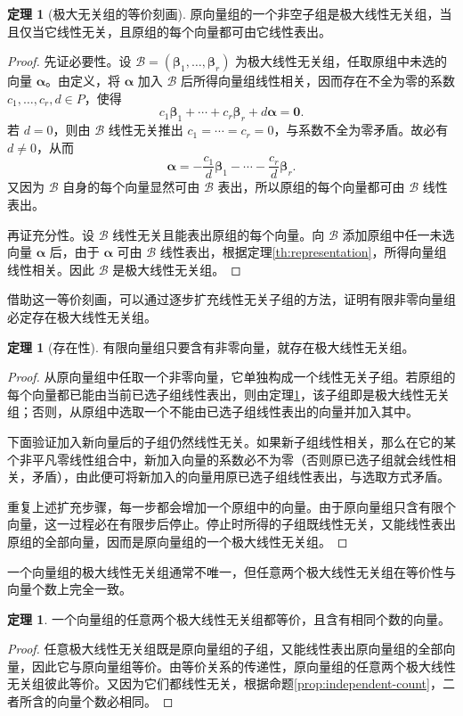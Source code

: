 \documentclass[UTF8, fontset=fandol, a4paper, 12pt]{ctexart}
\newcommand{\va}{\boldsymbol\alpha}
\newcommand{\vb}{\boldsymbol\beta}
\newcommand{\vo}{\boldsymbol0}
\theoremstyle{definition}
\newtheorem{theorem}[definition]{定理}
\begin{document}
\begin{theorem}[极大无关组的等价刻画]\label{th:maximal}
原向量组的一个非空子组是极大线性无关组，当且仅当它线性无关，且原组的每个向量都可由它线性表出。
\end{theorem}
\begin{proof}
先证必要性。设 $\mathcal B=(\vb_1,\ldots,\vb_r)$ 为极大线性无关组，任取原组中未选的向量 $\va$。由定义，将 $\va$ 加入 $\mathcal B$ 后所得向量组线性相关，因而存在不全为零的系数 $c_1,\ldots,c_r,d\in P$，使得
\[
 c_1\vb_1+\cdots+c_r\vb_r+d\va=\vo.
\]
若 $d=0$，则由 $\mathcal B$ 线性无关推出 $c_1=\cdots=c_r=0$，与系数不全为零矛盾。故必有 $d\ne0$，从而
\[
 \va=-\frac{c_1}{d}\vb_1-\cdots-\frac{c_r}{d}\vb_r.
\]
又因为 $\mathcal B$ 自身的每个向量显然可由 $\mathcal B$ 表出，所以原组的每个向量都可由 $\mathcal B$ 线性表出。

再证充分性。设 $\mathcal B$ 线性无关且能表出原组的每个向量。向 $\mathcal B$ 添加原组中任一未选向量 $\va$ 后，由于 $\va$ 可由 $\mathcal B$ 线性表出，根据定理\ref{th:representation}，所得向量组线性相关。因此 $\mathcal B$ 是极大线性无关组。
\end{proof}

借助这一等价刻画，可以通过逐步扩充线性无关子组的方法，证明有限非零向量组必定存在极大线性无关组。

\begin{theorem}[存在性]
有限向量组只要含有非零向量，就存在极大线性无关组。
\end{theorem}
\begin{proof}
从原向量组中任取一个非零向量，它单独构成一个线性无关子组。若原组的每个向量都已能由当前已选子组线性表出，则由定理\ref{th:maximal}，该子组即是极大线性无关组；否则，从原组中选取一个不能由已选子组线性表出的向量并加入其中。

下面验证加入新向量后的子组仍然线性无关。如果新子组线性相关，那么在它的某个非平凡零线性组合中，新加入向量的系数必不为零（否则原已选子组就会线性相关，矛盾），由此便可将新加入的向量用原已选子组线性表出，与选取方式矛盾。

重复上述扩充步骤，每一步都会增加一个原组中的向量。由于原向量组只含有限个向量，这一过程必在有限步后停止。停止时所得的子组既线性无关，又能线性表出原组的全部向量，因而是原向量组的一个极大线性无关组。
\end{proof}

一个向量组的极大线性无关组通常不唯一，但任意两个极大线性无关组在等价性与向量个数上完全一致。

\begin{theorem}
一个向量组的任意两个极大线性无关组都等价，且含有相同个数的向量。
\end{theorem}
\begin{proof}
任意极大线性无关组既是原向量组的子组，又能线性表出原向量组的全部向量，因此它与原向量组等价。由等价关系的传递性，原向量组的任意两个极大线性无关组彼此等价。又因为它们都线性无关，根据命题\ref{prop:independent-count}，二者所含的向量个数必相同。
\end{proof}
\end{document}
